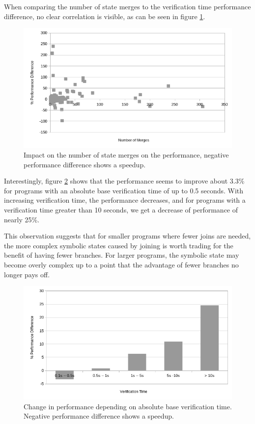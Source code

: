 \documentclass[11pt]{article}
\begin{document}
    When comparing the number of state merges 
    to the verification time performance difference, no clear correlation is
    visible, as can be seen in figure \ref{fig:state-merges}.

    \begin{figure}[H]
        \includegraphics[width=\linewidth]{state-merges-vs-performance.png}
        \caption{
            Impact on the number of state merges on the performance,
            negative performance difference shows a speedup.
        }
        \label{fig:state-merges}
    \end{figure}

    Interestingly, figure \ref{fig:absolute-verification-time} shows that the performance seems to improve about 3.3\% for programs
    with an absolute base verification time of up to 0.5 seconds. With increasing verification
    time, the performance decreases, and for programs with a verification time greater
    than 10 seconds, we get a decrease of performance of nearly 25\%.
    
    This observation suggests that for smaller programs where fewer joins are needed, the more complex symbolic
    states caused by joining is worth trading for the benefit of having fewer branches. For
    larger programs, the symbolic state may become overly complex up to a point that the advantage of
    fewer branches no longer pays off.

    \begin{figure}[H]
        \includegraphics[width=\linewidth]{performance-change-vs-verification-time-part-2.png}
        \caption{
            Change in performance depending on absolute base verification time. Negative performance difference shows a speedup.
        }
        \label{fig:absolute-verification-time}
    \end{figure}
\end{document}
